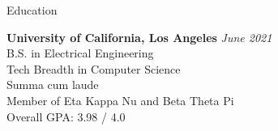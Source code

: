 \documentclass[ 11pt ]{resume}
\begin{document}

\begin{rSection}{Education}

	\textbf{University of California, Los Angeles} \hfill \textit{June 2021} \\
	B.S. in Electrical Engineering \\
	Tech Breadth in Computer Science \smallskip \\
	Summa cum laude \\
	Member of Eta Kappa Nu and Beta Theta Pi \\
	Overall GPA: 3.98 / 4.0

\end{rSection}

\end{document}
